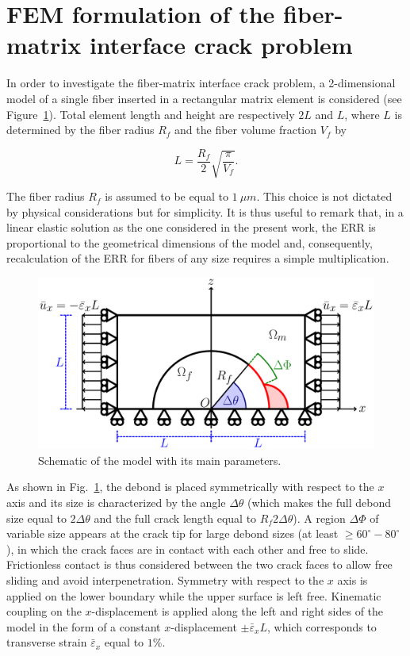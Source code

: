 \documentclass[review]{elsarticle}
\begin{document}
\section{FEM formulation of the fiber-matrix interface crack problem}

In order to investigate the fiber-matrix interface crack problem, a 2-dimensional model of a single fiber inserted in a rectangular matrix element is considered (see Figure~\ref{fig:modelschem}). Total element length and height are respectively $2L$ and $L$, where $L$ is determined by the fiber radius $R_{f}$ and the fiber volume fraction $V_{f}$ by

\begin{equation}\label{eq:LVf}
L=\frac{R_{f}}{2}\sqrt{\frac{\pi}{V_{f}}}.
\end{equation}

The fiber radius $R_{f}$ is assumed to be equal to $1\ \mu m$. This choice is not dictated by physical considerations but for simplicity. It is thus useful to remark that, in a linear elastic solution as the one considered in the present work, the ERR is proportional to the geometrical dimensions of the model and, consequently, recalculation of the ERR for fibers of any size requires a simple multiplication.

\begin{figure}[!h]
\centering
\includegraphics[width=\textwidth]{RUC.pdf}
\caption{Schematic of the model with its main parameters.}\label{fig:modelschem}
\end{figure}

As shown in Fig.~\ref{fig:modelschem}, the debond is placed symmetrically with respect to the $x$ axis and its size is characterized by the angle $\Delta\theta$ (which makes the full debond size equal to $2\Delta\theta$ and the full crack length equal to $R_{f}2{\Delta\theta}$). A region $\Delta\Phi$ of variable size appears at the crack tip for large debond sizes (at least $\geq 60^{\circ}-80^{\circ}$), in which the crack faces are in contact with each other and free to slide. Frictionless contact is thus considered between the two crack faces to allow free sliding and avoid interpenetration. Symmetry with respect to the $x$ axis is applied on the lower boundary while the upper surface is left free. Kinematic coupling on the $x$-displacement is applied along the left and right sides of the model in the form of a constant $x$-displacement $\pm\bar{\varepsilon}_{x} L$, which corresponds to transverse strain $\bar{\varepsilon}_{x}$ equal to $1\%$.
\end{document}
